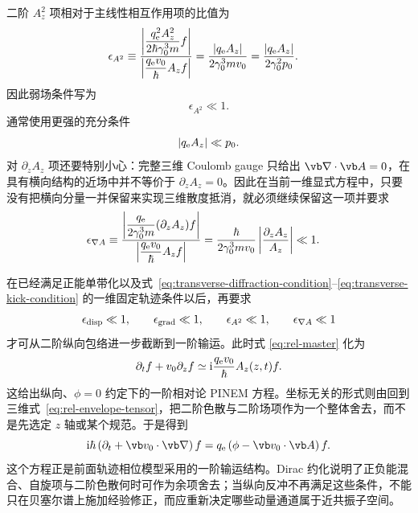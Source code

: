 二阶 $A_z^2$ 项相对于主线性相互作用项的比值为
\begin{align}
 \epsilon_{A^2}
 &\equiv
 \frac{\left|\dfrac{q_{\rm e}^2A_z^2}{2\hbar\gamma_0^3m}f\right|}
 {\left|\dfrac{q_{\rm e}v_0}{\hbar}A_zf\right|}
 =\frac{|q_{\rm e}A_z|}{2\gamma_0^3mv_0}
 =\frac{|q_{\rm e}A_z|}{2\gamma_0^2p_0}.
 \label{eq:eps-A2}
\end{align}
因此弱场条件写为
\begin{equation}
 {\epsilon_{A^2}\ll1.}
 \label{eq:first-order-gradient-condition}
\end{equation}
通常使用更强的充分条件
\begin{equation}
 {|q_{\rm e}A_z|\ll p_0.}
 \label{eq:weak-field-condition}
\end{equation}
对 $\partial_zA_z$ 项还要特别小心：完整三维 Coulomb gauge 只给出 $\vb\nabla\cdot\vb A=0$，在具有横向结构的近场中并不等价于 $\partial_zA_z=0$。因此在当前一维显式方程中，只要没有把横向分量一并保留来实现三维散度抵消，就必须继续保留这一项并要求
\begin{align}
 \epsilon_{\nabla A}
 &\equiv
 \frac{\left|\dfrac{q_{\rm e}}{2\gamma_0^3m}(\partial_zA_z)f\right|}
 {\left|\dfrac{q_{\rm e}v_0}{\hbar}A_zf\right|}
 =\frac{\hbar}{2\gamma_0^3mv_0}
 \left|\frac{\partial_zA_z}{A_z}\right|
 \ll1.
 \label{eq:eps-div}
\end{align}

在已经满足正能单带化以及式~\cref{eq:transverse-diffraction-condition}--\cref{eq:transverse-kick-condition} 的一维固定轨迹条件以后，再要求
\begin{equation}
 {
 \epsilon_{\rm disp}\ll1,
 \qquad
 \epsilon_{\rm grad}\ll1,
 \qquad
 \epsilon_{A^2}\ll1,
 \qquad
 \epsilon_{\nabla A}\ll1}
 \label{eq:first-order-allconditions}
\end{equation}
才可从二阶纵向包络进一步截断到一阶输运。此时式 \cref{eq:rel-master} 化为
\begin{equation}
 {
 \partial_t f
 +v_0\partial_z f
 \simeq
 \mathrm{i}\frac{q_{\rm e}v_0}{\hbar}A_z(z,t)f.}
 \label{eq:first-order-pinem}
\end{equation}
这给出纵向、$\phi=0$ 约定下的一阶相对论 PINEM 方程。坐标无关的形式则由回到三维式~\cref{eq:rel-envelope-tensor}，把二阶色散与二阶场项作为一个整体舍去，而不是先选定 $z$ 轴或某个规范。于是得到
\begin{equation}
{
\ii\hbar\left(\partial_t+\vb v_0\cdot\vb\nabla\right)f
=q_{\rm e}\left(\phi-\vb v_0\cdot\vb A\right)f.}
\label{eq:eikonal-master-general}
\end{equation}
这个方程正是前面轨迹相位模型采用的一阶输运结构。Dirac 约化说明了正负能混合、自旋项与二阶色散何时可作为余项舍去；当纵向反冲不再满足这些条件，不能只在贝塞尔谱上施加经验修正，而应重新决定哪些动量通道属于近共振子空间。

